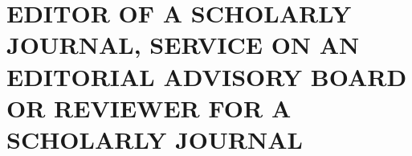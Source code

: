 \section{EDITOR OF A SCHOLARLY JOURNAL, SERVICE ON AN EDITORIAL
  ADVISORY BOARD OR REVIEWER FOR A SCHOLARLY JOURNAL}